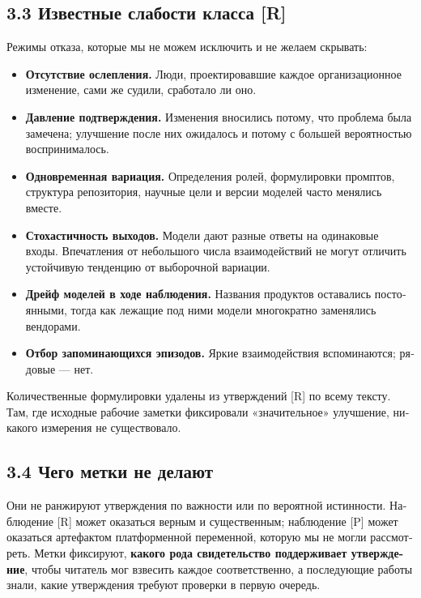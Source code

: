 \begin{russian}
\subsection*{3.3 Известные слабости класса [R]}
\label{sec:ru:3.3}

Режимы отказа, которые мы не можем исключить и не желаем скрывать:

\begin{itemize}
  \item \textbf{Отсутствие ослепления.} Люди, проектировавшие каждое организационное изменение, сами же судили, сработало ли оно.
  \item \textbf{Давление подтверждения.} Изменения вносились потому, что проблема была замечена; улучшение после них ожидалось и потому с большей вероятностью воспринималось.
  \item \textbf{Одновременная вариация.} Определения ролей, формулировки промптов, структура репозитория, научные цели и версии моделей часто менялись вместе.
  \item \textbf{Стохастичность выходов.} Модели дают разные ответы на одинаковые входы. Впечатления от небольшого числа взаимодействий не могут отличить устойчивую тенденцию от выборочной вариации.
  \item \textbf{Дрейф моделей в ходе наблюдения.} Названия продуктов оставались постоянными, тогда как лежащие под ними модели многократно заменялись вендорами.
  \item \textbf{Отбор запоминающихся эпизодов.} Яркие взаимодействия вспоминаются; рядовые — нет.
\end{itemize}
Количественные формулировки удалены из утверждений [R] по всему тексту. Там, где исходные рабочие заметки фиксировали «значительное» улучшение, никакого измерения не существовало.


\subsection*{3.4 Чего метки не делают}
\label{sec:ru:3.4}

Они не ранжируют утверждения по важности или по вероятной истинности. Наблюдение [R] может оказаться верным и существенным; наблюдение [P] может оказаться артефактом платформенной переменной, которую мы не могли рассмотреть. Метки фиксируют, \textbf{какого рода свидетельство поддерживает утверждение}, чтобы читатель мог взвесить каждое соответственно, а последующие работы знали, какие утверждения требуют проверки в первую очередь.



\end{russian}
